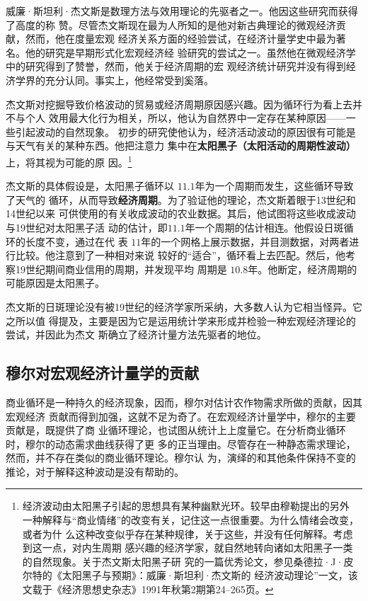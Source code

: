 威廉·斯坦利·杰文斯是数理方法与效用理论的先驱者之一。他因这些研究而获得了高度的称
赞。尽管杰文斯现在最为人所知的是他对新古典理论的微观经济贡献，然而，他在度量宏观
经济关系方面的经验尝试，在经济计量学史中最为著名。他的研究是早期形式化宏观经济经
验研究的尝试之一。虽然他在微观经济学中的研究得到了赞誉，然而，他关于经济周期的宏
观经济统计研究并没有得到经济学界的充分认同。事实上，他经常受到奚落。

杰文斯对挖掘导致价格波动的贸易或经济周期原因感兴趣。因为循环行为看上去并不与个人
效用最大化行为相关，所以，他认为自然界中一定存在某种原因——一些引起波动的自然现象。
初步的研究使他认为，经济活动波动的原因很有可能是与天气有关的某种东西。他把注意力
集中在\textbf{太阳黑子（太阳活动的周期性波动）}上，将其视为可能的原
因。\footnote{经济波动由太阳黑子引起的思想具有某种幽默光环。较早由穆勒提出的另外
  一种解释与“商业情绪”的改变有关，记住这一点很重要。为什么情绪会改变，或者为什
  么这种改变似乎存在某种规律，关于这些，并没有任何解释。考虑到这一点，对内生周期
  感兴趣的经济学家，就自然地转向诸如太阳黑子一类的自然现象。关于杰文斯太阳黑子研
  究的一篇优秀论文，参见桑德拉·J·皮尔特的《太阳黑子与预期》：威廉·斯坦利·杰文斯的
  经济波动理论”一文，该文载于《经济思想史杂志》1991年秋第2期第24--265页。}

杰文斯的具体假设是，太阳黑子循环以 $11.1$年为一个周期而发生，这些循环导致了天气的
循环，从而导致\textbf{经济周期}。为了验证他的理论，杰文斯着眼于13世纪和14世纪以来
可供使用的有关收成波动的农业数据。其后，他试图将这些收成波动与19世纪对太阳黑子活
动的估计，即$11.1$年一个周期的估计相连。他假设日斑循环的长度不变，通过在代
表 $11$年的一个网格上展示数据，并目测数据，对两者进行比较。他注意到了一种相对来说
较好的“适合”，循环看上去匹配。然后，他考察19世纪期间商业信用的周期，并发现平均
周期是 $10.8$年。他断定，经济周期的可能原因是太阳黑子。

杰文斯的日斑理论没有被19世纪的经济学家所采纳，大多数人认为它相当怪异。它之所以值
得提及，主要是因为它是运用统计学来形成并检验一种宏观经济理论的尝试，并因此为杰文
斯确立了经济计量方法先驱者的地位。

\subsection{穆尔对宏观经济计量学的贡献}

商业循环是一种持久的经济现象，因而，穆尔对估计农作物需求所做的贡献，因其宏观经济
贡献而得到加强，这就不足为奇了。在宏观经济计量学中，穆尔的主要贡献是，既提供了商
业循环理论，也试图从统计上上度量它。在分析商业循环时，穆尔的动态需求曲线获得了更
多的正当理由。尽管存在一种静态需求理论，然而，并不存在类似的商业循环理论。穆尔认
为，演绎的和其他条件保持不变的推论，对于解释这种波动是没有帮助的。


